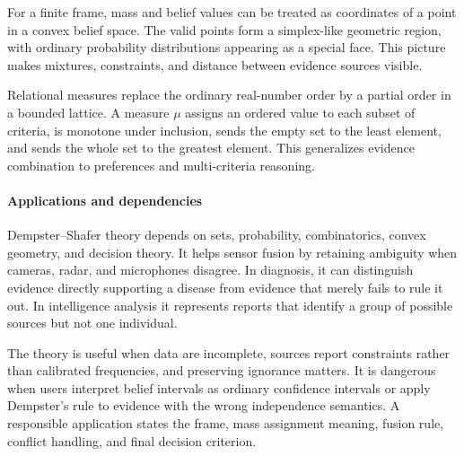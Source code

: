 For a finite frame, mass and belief values can be treated as coordinates of a point in a convex belief space. The valid points form a simplex-like geometric region, with ordinary probability distributions appearing as a special face. This picture makes mixtures, constraints, and distance between evidence sources visible.

Relational measures replace the ordinary real-number order by a partial order in a bounded lattice. A measure $\mu$ assigns an ordered value to each subset of criteria, is monotone under inclusion, sends the empty set to the least element, and sends the whole set to the greatest element. This generalizes evidence combination to preferences and multi-criteria reasoning. \cite{dempster_shafer_theory_ref9}

\paragraph{Applications and dependencies}

Dempster--Shafer theory depends on sets, probability, combinatorics, convex geometry, and decision theory. It helps sensor fusion by retaining ambiguity when cameras, radar, and microphones disagree. In diagnosis, it can distinguish evidence directly supporting a disease from evidence that merely fails to rule it out. In intelligence analysis it represents reports that identify a group of possible sources but not one individual.

The theory is useful when data are incomplete, sources report constraints rather than calibrated frequencies, and preserving ignorance matters. It is dangerous when users interpret belief intervals as ordinary confidence intervals or apply Dempster's rule to evidence with the wrong independence semantics. A responsible application states the frame, mass assignment meaning, fusion rule, conflict handling, and final decision criterion.

